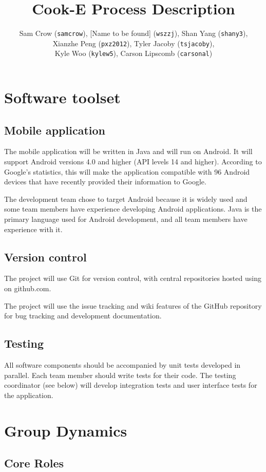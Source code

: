 \documentclass[10pt]{article}
\title{Cook-E Process Description}
\author{Sam Crow (\texttt{samcrow}), [Name to be found] (\texttt{wszzj}), Shan Yang (\texttt{shany3}),\\ Xianzhe Peng (\texttt{pxz2012}), Tyler Jacoby (\texttt{tsjacoby}),\\ Kyle Woo (\texttt{kylew5}), Carson Lipscomb (\texttt{carsonal})}
\begin{document}
\maketitle{}


\section{Software toolset}

\subsection{Mobile application}

The mobile application will be written in Java and will run on Android. It will support Android versions 4.0 and higher
(API levels 14 and higher). According to Google's statistics, this will make the application compatible with 96%
Android devices that have recently provided their information to Google.

The development team chose to target Android because it is widely used and some team members have experience developing
Android applications. Java is the primary language used for Android development, and all team members have experience with
it.

\subsection{Version control}

The project will use Git for version control, with central repositories hosted using on github.com.

The project will use the issue tracking and wiki features of the GitHub repository for bug tracking and development documentation.
\subsection{Testing}

All software components should be accompanied by unit tests developed in parallel.
Each team member should write tests for their code.
The testing coordinator (see below) will develop integration tests and user interface tests for the application.

\section{Group Dynamics}

\subsection{Core Roles}
\end{document}
